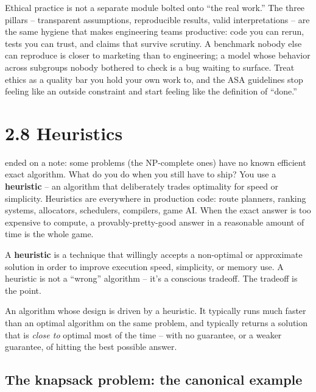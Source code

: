 \documentclass[11pt]{article}
\begin{document}
\begin{ideabox}
Ethical practice is not a separate module bolted onto ``the real
work.'' The three pillars -- transparent assumptions, reproducible
results, valid interpretations -- are the same hygiene that makes
engineering teams productive: code you can rerun, tests you can
trust, and claims that survive scrutiny. A benchmark nobody else
can reproduce is closer to marketing than to engineering; a model
whose behavior across subgroups nobody bothered to check is a bug
waiting to surface. Treat ethics as a quality bar you hold your own
work to, and the ASA guidelines stop feeling like an outside
constraint and start feeling like the definition of ``done.''
\end{ideabox}

\section{2.8 Heuristics}

 ended on a note: some problems (the NP-complete ones)
have no known efficient exact algorithm. What do you do when you still
have to ship? You use a \textbf{heuristic} -- an algorithm that
deliberately trades optimality for speed or simplicity. Heuristics
are everywhere in production code: route planners, ranking systems,
allocators, schedulers, compilers, game AI. When the exact answer is
too expensive to compute, a provably-pretty-good answer in a
reasonable amount of time is the whole game.

\begin{defnbox}[Heuristic]
A \textbf{heuristic} is a technique that willingly accepts a
non-optimal or approximate solution in order to improve execution
speed, simplicity, or memory use. A heuristic is not a
``wrong'' algorithm -- it's a conscious tradeoff. The tradeoff is the
point.
\end{defnbox}

\begin{defnbox}
An algorithm whose design is driven by a heuristic. It typically runs
much faster than an optimal algorithm on the same problem, and
typically returns a solution that is \emph{close to} optimal most of
the time -- with no guarantee, or a weaker guarantee, of hitting the
best possible answer.
\end{defnbox}

\subsection{The knapsack problem: the canonical example}
\end{document}
